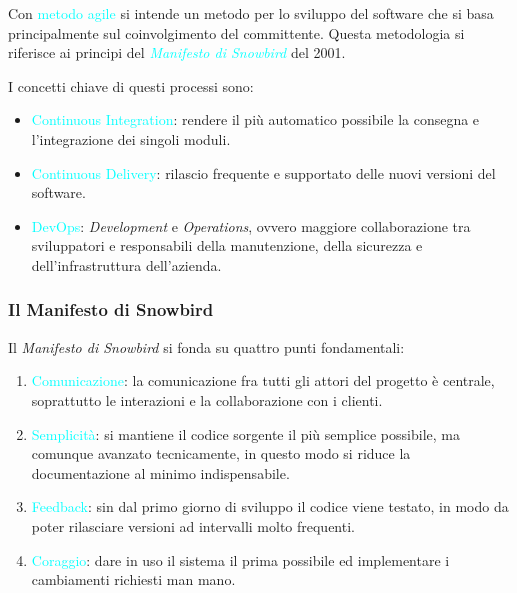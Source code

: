 \begin{definition}
    Con \textcolor{cyan}{metodo agile} si intende un metodo per lo sviluppo del software
    che si basa principalmente sul coinvolgimento del committente.
    Questa metodologia si riferisce ai principi del \emph{\textcolor{cyan}{Manifesto di Snowbird}} del 2001.
\end{definition}

I concetti chiave di questi processi sono:

\begin{itemize}
    \item \textcolor{cyan}{Continuous Integration}: rendere il più automatico possibile la consegna e l'integrazione dei singoli moduli.
    \item \textcolor{cyan}{Continuous Delivery}: rilascio frequente e supportato delle nuovi versioni del software.
    \item \textcolor{cyan}{DevOps}: \emph{Development} e \emph{Operations}, ovvero maggiore collaborazione tra sviluppatori e responsabili della
        manutenzione, della sicurezza e dell'infrastruttura dell'azienda.
\end{itemize}

\subsubsection{Il Manifesto di Snowbird}

Il \emph{Manifesto di Snowbird} si fonda su quattro punti fondamentali:

\begin{enumerate}
    \item \textcolor{cyan}{Comunicazione}: la comunicazione fra tutti gli attori del progetto è centrale, soprattutto le interazioni e
        la collaborazione con i clienti.
    \item \textcolor{cyan}{Semplicità}: si mantiene il codice sorgente il più semplice possibile, ma comunque avanzato tecnicamente,
        in questo modo si riduce la documentazione al minimo indispensabile.
    \item \textcolor{cyan}{Feedback}: sin dal primo giorno di sviluppo il codice viene testato, in modo da poter rilasciare versioni ad intervalli molto frequenti.
    \item \textcolor{cyan}{Coraggio}: dare in uso il sistema il prima possibile ed implementare i cambiamenti richiesti man mano.
\end{enumerate}

